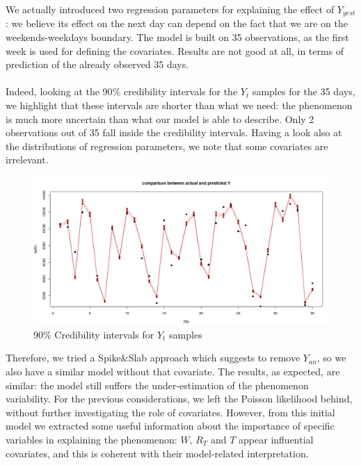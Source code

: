 \documentclass[11pt,twoside]{report}
\begin{document}
We actually introduced two regression parameters for explaining the effect of $Y_{yest}$: we believe its effect on the next day can depend on the fact that we are on the weekends-weekdays boundary.   
The model is built on 35 observations, as the first week is used for defining the covariates. Results are not good at all, in terms of prediction of the already observed 35 days.\\
\\
Indeed, looking at the 90$\%$ credibility intervals for the $Y_t$ samples for the 35 days, we highlight that these intervals are shorter than what we need: the phenomenon is much more uncertain than what our model is able to describe.
Only 2 observations out of 35 fall inside the credibility intervals.
Having a look also at the distributions of regression parameters, we note that some covariates are irrelevant.
\begin{figure}[H]
	\centering
	\includegraphics[width=160 mm]{pictures/poiss_y.png}
	\caption{90$\%$ Credibility intervals for $Y_t$ samples}
	\label{fig:poiss}
\end{figure}
Therefore, we tried a Spike\&Slab approach which suggests to remove $Y_{an}$, so we also have a similar model without that covariate. The results, as expected, are similar: the model still suffers the under-estimation of the phenomenon variability. For the previous considerations, we left the Poisson likelihood behind, without further investigating the role of covariates. However, from this initial model we extracted some useful information about the importance of specific variables in explaining the phenomenon: $W$, $R_T$ and $T$ appear influential covariates, and this is coherent with their model-related interpretation.
\end{document}
